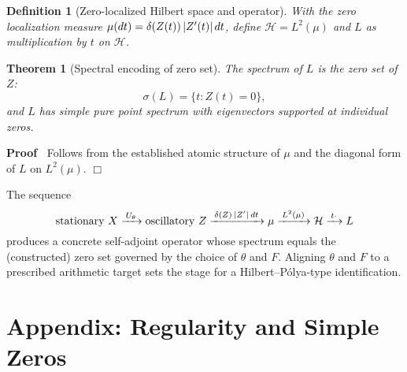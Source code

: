 \documentclass{article}
\newenvironment{proof}{\noindent\textbf{Proof\ }}{\hspace*{\fill}$\Box$\medskip}
\newtheorem{definition}{Definition}
\newtheorem{theorem}{Theorem}
\begin{document}
\begin{definition}
  [Zero-localized Hilbert space and operator] With the zero localization
  measure $\mu (dt) = \delta (Z (t)) \hspace{0.17em} |Z' (t) | 
  \hspace{0.17em} dt$, define $\mathcal{H}= L^2 (\mu)$ and $L$ as
  multiplication by $t$ on $\mathcal{H}$.
\end{definition}

\begin{theorem}
  [Spectral encoding of zero set] The spectrum of $L$ is the zero set of $Z$:
  \[ \sigma (L) = \{t : Z (t) = 0\}, \]
  and $L$ has simple pure point spectrum with eigenvectors supported at
  individual zeros.
\end{theorem}

\begin{proof}
  Follows from the established atomic structure of $\mu$ and the diagonal form
  of $L$ on $L^2 (\mu)$.
\end{proof}

\begin{remark}
   The sequence
  \begin{equation}
    \text{stationary } X \xrightarrow{\hspace{0.17em} U_{\theta}
    \hspace{0.17em}} \text{oscillatory } Z \xrightarrow{\hspace{0.17em} \delta
    (Z) \hspace{0.17em} |Z' |  \hspace{0.17em} dt \hspace{0.17em}} \mu
    \xrightarrow{\hspace{0.17em} L^2 (\mu) \hspace{0.17em}} \mathcal{H}
    \xrightarrow{\hspace{0.17em} t \cdot \hspace{0.17em}} L
  \end{equation}
  produces a concrete self-adjoint operator whose spectrum equals the
  (constructed) zero set governed by the choice of $\theta$ and $F$. Aligning
  $\theta$ and $F$ to a prescribed arithmetic target sets the stage for a
  Hilbert--P{\'o}lya-type identification.
\end{remark}

\section{Appendix: Regularity and Simple Zeros}
\end{document}
